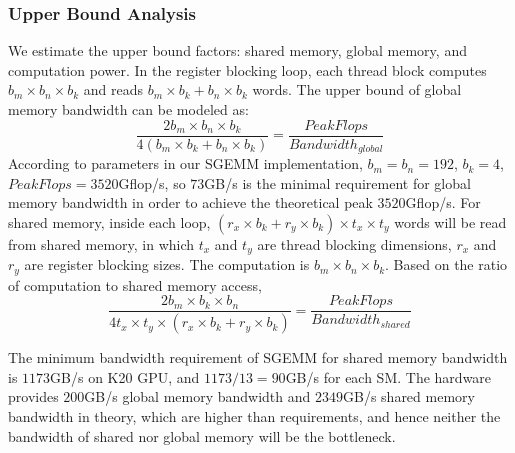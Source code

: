 \subsubsection{Upper Bound Analysis}

We estimate the upper bound factors: 
shared memory, global memory, and computation power. In the register blocking loop, each thread block computes $b_m \times b_n \times b_k$ and reads $b_m \times b_k+b_n \times b_k$ words. The upper bound of global memory bandwidth can be modeled as:
\begin{equation}
    \frac{2 b_m \times b_n \times b_k}{4 (b_m \times b_k + b_n \times b_k)} = \frac{PeakFlops}{Bandwidth_{global}}
    \label{equ:global}
\end{equation}
According to parameters in our SGEMM implementation, $b_m=b_n=192$, $b_k=4$, $PeakFlops=3520$Gflop/s, so $73$GB/s is the minimal
requirement for global memory bandwidth in order to achieve the theoretical peak $3520$Gflop/s.
For shared memory, inside each loop, $(r_x \times b_k + r_y \times b_k) \times t_x \times t_y$ words will be read from shared memory, in which $t_x$ and
$t_y$ are thread blocking dimensions, $r_x$ and $r_y$ are register blocking sizes. The computation is $b_m \times b_n \times b_k$. Based on the ratio of computation to shared memory access,
\begin{equation}
    \frac{2 b_m \times b_k \times b_n}{4 t_x \times t_y \times (r_x \times b_k + r_y  \times b_k)}  = \frac{PeakFlops}{Bandwidth_{shared}}
    \label{equ:shared}
\end{equation}


The minimum bandwidth requirement of SGEMM for shared memory bandwidth is
$1173$GB/s on K20 GPU, and $1173/13=90$GB/s for each SM. The hardware provides
$200$GB/s global memory bandwidth and $2349$GB/s shared memory bandwidth in
theory, which are higher than requirements, and hence neither the bandwidth of
shared nor global memory will be the bottleneck.

